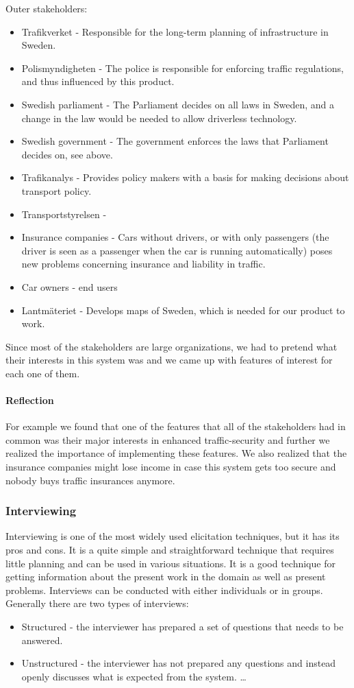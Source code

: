 \documentclass[10pt]{article}
\begin{document}
Outer stakeholders:
\begin{itemize}
\item Trafikverket - Responsible for the long-term planning of infrastructure in Sweden.
\item Polismyndigheten - The police is responsible for enforcing traffic regulations, and thus influenced by this product.
\item Swedish parliament - The Parliament decides on all laws in Sweden, and a change in the law would be needed to allow driverless technology.
\item Swedish government - The government enforces the laws that Parliament decides on, see above.
\item Trafikanalys - Provides policy makers with a basis for making decisions about transport policy.
\item Transportstyrelsen - 
\item Insurance companies - Cars without drivers, or with only passengers (the driver is seen as a passenger when the car is running automatically) poses new problems concerning insurance and liability in traffic.
\item Car owners - end users
\item Lantmäteriet - Develops maps of Sweden, which is needed for our product to work.
\end{itemize}

Since most of the stakeholders are large organizations, we had to pretend what their interests in this system was and we came up with features of interest for each one of them.
\paragraph{Reflection}
\hfill \break
For example we found that one of the features that all of the stakeholders had in common was their major interests in enhanced traffic-security and further we realized the importance of implementing these features. We also realized that the insurance companies might lose income in case this system gets too secure and nobody buys traffic insurances anymore.

\subsubsection{Interviewing}
Interviewing is one of the most widely used elicitation techniques, but it has its pros and cons. It is a quite simple and straightforward technique that requires little planning and can be used in various situations. It is a good technique for getting information about the present work in the domain as well as present problems. Interviews can be conducted with either individuals or in groups.
Generally there are two types of interviews: 
\begin{itemize}
    \item Structured - the interviewer has prepared a set of questions that needs to be answered. 
    \item Unstructured - the interviewer has not prepared any questions and instead           openly discusses what is expected from the system. \ldots 
\end{itemize}
\end{document}
